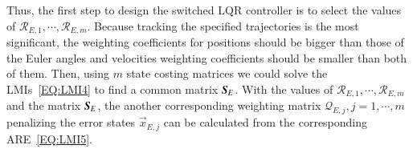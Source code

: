 Thus, the first step to design the switched LQR controller is to select the values of $\mathcal{R}_{E,1}, \cdots, \mathcal{R}_{E,m}$. Because tracking the specified trajectories is the most significant, the weighting coefficients for positions should be bigger than those of the Euler angles and velocities weighting coefficients should be smaller than both of them. Then, using $m$ state costing matrices we could solve the LMIs~\ref{EQ:LMI4} to find a common matrix $\emph{\textbf{S}}_{E}$. With the values of $\mathcal{R}_{E,1}, \cdots, \mathcal{R}_{E,m}$ and the matrix $\emph{\textbf{S}}_{E}$, the another corresponding weighting matrix $\mathcal{Q}_{E,j}, j=1, \cdots, m$ penalizing the error states $\vec{x}_{E,j}$ can be calculated from the corresponding ARE~\ref{EQ:LMI5}.  



